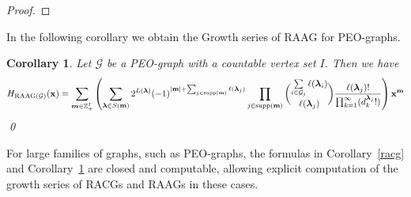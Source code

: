 \documentclass[11pt,reqno]{amsart}
\numberwithin{equation}{section} %
\newtheorem{cor}{Corollary}
\theoremstyle{definition}
\theoremstyle{remark}
\newcommand{\RAAG}{\operatorname{RAAG}}
\numberwithin{equation}{section}
\begin{document}
\begin{proof}
   




        \end{proof}

In the following corollary we obtain the Growth series of RAAG for PEO-graphs.
\begin{cor}\label{peohilbert}
 Let $\mathcal{G}$ be a PEO-graph with a countable vertex set $I$. Then we have 
 $$H_{\RAAG(\mathcal G)}(\mathbf x)=\sum\limits_{\boldsymbol{m}\in \mathbb{Z}^I_+}\left(\sum\limits_{\boldsymbol{\lambda}\in S(\bold m)}2^{L(\boldsymbol{\lambda})}(-1)^{|\mathbf{m}|+\sum_{j\in \mathrm{supp}(\bold{m})}\ell(\boldsymbol{\lambda}_{j})}\prod _{j\in \mathrm{supp}(\bold{m})} \binom{\sum\limits_{i\in \mathcal{G}_j}\ell(\boldsymbol{\lambda}_{i})}{\ell(\boldsymbol{\lambda}_{j})} \frac{\ell(\boldsymbol{\lambda}_{j})!}{\prod_{k=1}^{\infty}(d^{\boldsymbol{\lambda}_{j}}_{k}!)}\right) \bold x^\mathbf{m}$$ \qed
 
\end{cor}
For large families of graphs, such as PEO-graphs, the formulas in Corollary~\ref{racg} and Corollary~\ref{peohilbert} are closed and computable, allowing explicit computation of the growth series of RACGs and RAAGs in these cases.
\end{document}
